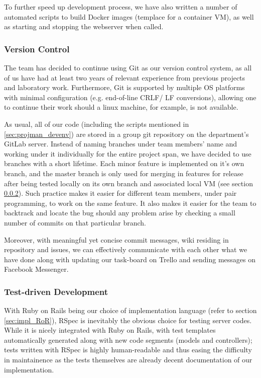 \documentclass[a4paper, titlepage]{article}
\begin{document}
To further speed up development process, we have also written a number of automated scripts
to build Docker images (templace for a container VM), as well as starting and stopping the
webserver when called.

\subsubsection{Version Control}
The team has decided to continue using Git as our version control system, as all of us have had
at least two years of relevant experience from previous projects and laboratory work. Furthermore,
Git is supported by multiple OS platforms with minimal configuration (e.g. end-of-line CRLF/ LF conversions),
allowing one to continue their work should a linux machine, for example, is not available.

As usual, all of our code (including the scripts mentioned in \ref{sec:projman_devenv}) 
are stored in a group git repository on the department's GitLab server. Instead of naming branches under team members'
name and working under it individually for the entire project span, we have decided to use branches with a short lifetime.
Each minor feature is implemented on it's own branch, and the master branch is only used for merging in features for release
after being tested locally on its own branch and associated local VM (see section \ref{sec:projman_tdd}).
Such practice makes it easier for different team members, under pair programming, to work on the same feature.
It also makes it easier for the team to backtrack and locate the bug should any problem arise by checking a small number of commits on that particular branch.

Moreover, with meaningful yet concise commit messages, wiki residing in repository and issues, we can effectively
communicate with each other what we have done along with updating our task-board
on Trello and sending messages on Facebook Messenger.


\subsubsection{Test-driven Development} \label{sec:projman_tdd}
With Ruby on Rails being our choice of implementation language (refer to section \ref{sec:impl_RoR}),
RSpec is inevitably the obvious choice for testing server codes.
While it is nicely integrated with Ruby on Rails, with test templates automatically
generated along with new code segments (models and controllers);
tests written with RSpec is highly human-readable and thus
easing the difficulty in maintainence as the tests themselves are already
decent documentation of our implementation.
\end{document}
